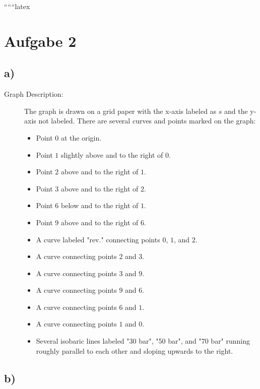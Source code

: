 
``````latex


\section*{Aufgabe 2}

\subsection*{a)}

\begin{description}
    \item[Graph Description:] The graph is drawn on a grid paper with the x-axis labeled as $s$ and the y-axis not labeled. There are several curves and points marked on the graph:
    \begin{itemize}
        \item Point $0$ at the origin.
        \item Point $1$ slightly above and to the right of $0$.
        \item Point $2$ above and to the right of $1$.
        \item Point $3$ above and to the right of $2$.
        \item Point $6$ below and to the right of $1$.
        \item Point $9$ above and to the right of $6$.
        \item A curve labeled "rev." connecting points $0$, $1$, and $2$.
        \item A curve connecting points $2$ and $3$.
        \item A curve connecting points $3$ and $9$.
        \item A curve connecting points $9$ and $6$.
        \item A curve connecting points $6$ and $1$.
        \item A curve connecting points $1$ and $0$.
        \item Several isobaric lines labeled "30 bar", "50 bar", and "70 bar" running roughly parallel to each other and sloping upwards to the right.
    \end{itemize}
\end{description}

\subsection*{b)}

